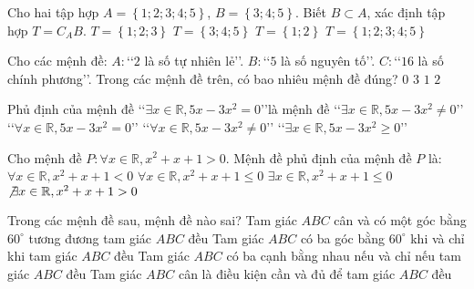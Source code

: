 \begin{ex}
	Cho hai tập hợp $A=\left\{ 1;2;3;4;5 \right\}$, $B=\left\{ 3;4;5 \right\}$.
	Biết $B\subset A$, xác định tập hợp $T=C_AB$.
	\choice
	{$T=\left\{ 1;2;3 \right\}$}
	{$T=\left\{ 3;4;5 \right\}$}
	{\True $T=\left\{ 1;2 \right\}$}
	{$T=\left\{ 1;2;3;4;5 \right\}$}
\end{ex}
\begin{ex}
	Cho các mệnh đề:
	$A\colon $\lq\lq$2$ là số tự nhiên lẻ\rq\rq.
	$B\colon $\lq\lq$5$ là số nguyên tố\rq\rq.
	$C\colon $\lq\lq$16$ là số chính phương\rq\rq.
	Trong các mệnh đề trên, có bao nhiêu mệnh đề đúng?
	\choice
	{$0$}
	{$3$}
	{$1$}
	{\True $2$}
\end{ex}
\begin{ex}
	Phủ định của mệnh đề \lq\lq$\exists x\in \mathbb{R},5x-3x^2=0$\rq\rq là mệnh đề
	\choice
	{\lq\lq$\exists x\in \mathbb{R},5x-3x^2\ne 0$\rq\rq}
    {\lq\lq$\forall x\in \mathbb{R},5x-3x^2=0$\rq\rq}
	{\True \lq\lq$\forall x\in \mathbb{R},5x-3x^2\ne 0$\rq\rq}
	{\lq\lq$\exists x\in \mathbb{R},5x-3x^2\ge 0$\rq\rq}
\end{ex}
\begin{ex}
	Cho mệnh đề $P\colon \forall x\in \mathbb{R},x^2+x+1>0$. Mệnh đề phủ định của mệnh đề $P$ là:
	\choice
	{$\forall x\in \mathbb{R},x^2+x+1<0$}
	{$\forall x\in \mathbb{R},x^2+x+1\le 0$}
	{\True $\exists x\in \mathbb{R},x^2+x+1\le 0$}
	{$\not\exists x\in \mathbb{R},x^2+x+1>0$}
\end{ex}
\begin{ex}
	Trong các mệnh đề sau, mệnh đề nào sai?
	\choice
	{Tam giác $ABC$ cân và có một góc bằng $60^\circ $ tương đương tam giác $ABC$ đều}
	{Tam giác $ABC$ có ba góc bằng $60^\circ $ khi và chỉ khi tam giác $ABC$ đều}
	{Tam giác $ABC$ có ba cạnh bằng nhau nếu và chỉ nếu tam giác $ABC$ đều}
	{\True Tam giác $ABC$ cân là điều kiện cần và đủ để tam giác $ABC$ đều}
\end{ex}
